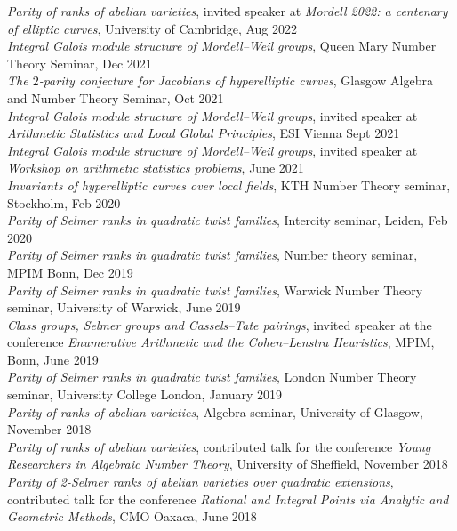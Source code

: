 \documentclass{res}
\begin{document}
\begin{resume}
\bigskip
\vspace{-0.1in}
{\it  Parity of ranks of abelian varieties}, invited speaker at {\it Mordell 2022: a centenary of elliptic curves}, University of Cambridge, Aug 2022    \medskip  \\
{\it  Integral Galois module structure of Mordell--Weil groups}, Queen Mary Number Theory Seminar, Dec 2021   \medskip  \\
{\it  The $2$-parity conjecture for Jacobians of hyperelliptic curves}, Glasgow Algebra and Number Theory Seminar, Oct 2021    \medskip  \\
{\it  Integral Galois module structure of Mordell--Weil groups}, invited speaker at {\it Arithmetic Statistics and Local Global Principles}, ESI Vienna Sept 2021    \medskip  \\
{\it  Integral Galois module structure of Mordell--Weil groups}, invited speaker at {\it Workshop on arithmetic statistics problems}, June 2021   \medskip  \\
{\it  Invariants of hyperelliptic curves over local fields}, KTH Number Theory seminar, Stockholm, Feb 2020  \vspace{-0.18in} \medskip  \\
{\it Parity of Selmer ranks in quadratic twist families}, Intercity seminar, Leiden, Feb 2020 \medskip \\
{\it Parity of Selmer ranks in quadratic twist families}, Number theory seminar, MPIM Bonn, Dec 2019 \medskip \\
{\it Parity of Selmer ranks in quadratic twist families}, Warwick Number Theory seminar, University of Warwick, June 2019 \medskip \\
{\it Class groups, Selmer groups and Cassels--Tate pairings}, invited speaker at the conference {\it Enumerative Arithmetic and the Cohen–Lenstra Heuristics}, MPIM, Bonn, June 2019 \medskip \\
{\it Parity of Selmer ranks in quadratic twist families}, London Number Theory seminar, University College London, January 2019  \medskip \\
{\it Parity of ranks of abelian varieties}, Algebra seminar, University of Glasgow, November 2018  \medskip \\
{\it Parity of ranks of abelian varieties},  contributed talk for the conference {\it Young Researchers in Algebraic Number Theory}, University of Sheffield, November 2018  \medskip \\
{\it Parity of 2-Selmer ranks of abelian varieties over quadratic extensions},  contributed talk for the conference {\it Rational and Integral Points via Analytic and Geometric Methods}, CMO Oaxaca, June 2018  \medskip \\

\end{resume}
\end{document}
